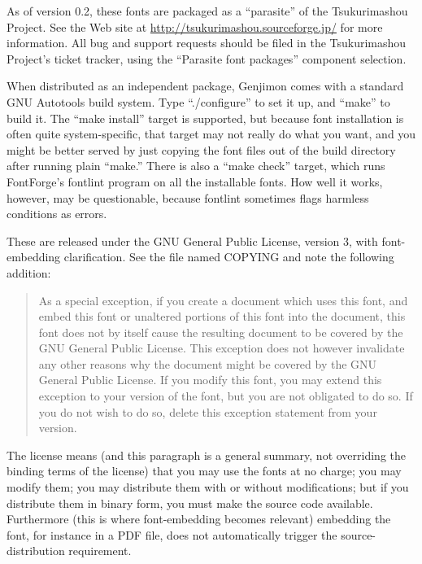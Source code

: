\documentclass[12pt]{article}
\begin{document}
As of version 0.2, these fonts are packaged as a ``parasite'' of the
Tsukurimashou Project.  See the Web site at
\url{http://tsukurimashou.sourceforge.jp/} for more information.  All bug
and support requests should be filed in the Tsukurimashou Project's ticket
tracker, using the ``Parasite font packages'' component selection.

When distributed as an independent package, Genjimon comes with a standard
GNU Autotools build system.  Type ``./configure'' to set it up, and ``make''
to build it.  The ``make install'' target is supported, but because font
installation is often quite system-specific, that target may not really do
what you want, and you might be better served by just copying the font files
out of the build directory after running plain ``make.''  There is also a
``make check'' target, which runs FontForge's fontlint program on all the
installable fonts.  How well it works, however, may be questionable, because
fontlint sometimes flags harmless conditions as errors.

These are released under the GNU General Public License, version 3, with
font-embedding clarification.  See the file named COPYING and note the
following addition:

\begin{quotation}
As a special exception, if you create a document which uses this font, and
embed this font or unaltered portions of this font into the document, this
font does not by itself cause the resulting document to be covered by the
GNU General Public License. This exception does not however invalidate any
other reasons why the document might be covered by the GNU General Public
License. If you modify this font, you may extend this exception to your
version of the font, but you are not obligated to do so. If you do not wish
to do so, delete this exception statement from your version.
\end{quotation}

The license means (and this paragraph is a general summary, not overriding
the binding terms of the license) that you may use the fonts at no charge;
you may modify them; you may distribute them with or without modifications;
but if you distribute them in binary form, you must make the source code
available.  Furthermore (this is where font-embedding becomes relevant)
embedding the font, for instance in a PDF file, does not automatically
trigger the source-distribution requirement.
\end{document}
